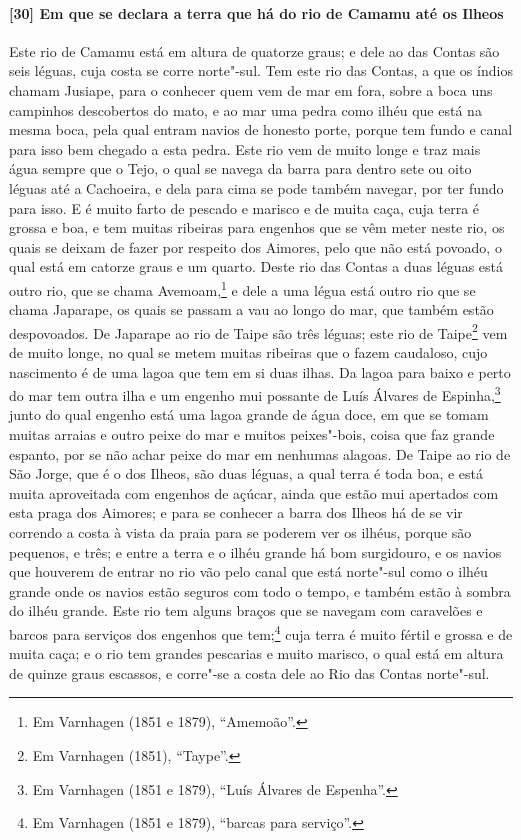 \paragraph{[30] Em que se declara a terra que há do rio de Camamu até os Ilheos} \quad
Este rio de Camamu está em altura de quatorze graus; e dele ao das Contas são seis léguas,
cuja costa se corre norte"-sul. Tem este rio das Contas, a que os índios chamam Jusiape,
para o conhecer quem vem de mar em fora, sobre a boca uns campinhos descobertos do mato, e
ao mar uma pedra como ilhéu que está na mesma boca, pela qual entram navios de honesto
porte, porque tem fundo e canal para isso bem chegado a esta pedra. Este rio vem de muito
longe e traz mais água sempre que o Tejo, o qual se navega da barra para dentro sete ou
oito léguas até a Cachoeira, e dela para cima se pode também navegar, por ter fundo para
isso. E é muito farto de pescado e marisco e de muita caça, cuja terra é grossa e boa, e
tem muitas ribeiras para engenhos que se vêm meter neste rio, os quais se deixam de fazer
por respeito dos Aimores, pelo que não está povoado, o qual está em catorze graus e um
quarto. Deste rio das Contas a duas léguas está outro rio, que se chama Avemoam,\footnote{
Em Varnhagen (1851 e 1879), ``Amemoão''.} e dele a uma légua está outro rio que se chama
Japarape, os quais se passam a vau ao longo do mar, que também estão despovoados. De
Japarape ao rio de Taipe são três léguas; este rio de Taipe\footnote{ Em Varnhagen (1851),
``Taype''.} vem de muito longe, no qual se metem muitas ribeiras que o fazem caudaloso,
cujo nascimento é de uma lagoa que tem em si duas ilhas. Da lagoa para baixo e perto do
mar tem outra ilha e um engenho mui possante de Luís Álvares de Espinha,\footnote{ Em
Varnhagen (1851 e 1879), ``Luís Álvares de Espenha''.} junto do qual engenho está uma
lagoa grande de água doce, em que se tomam muitas arraias e outro peixe do mar e muitos
peixes"-bois, coisa que faz grande espanto, por se não achar peixe do mar em nenhumas
alagoas. De Taipe ao rio de São Jorge, que é o dos Ilheos, são duas léguas, a qual terra é
toda boa, e está muita aproveitada com engenhos de açúcar, ainda que estão mui apertados
com esta praga dos Aimores; e para se conhecer a barra dos Ilheos há de se vir correndo a
costa à vista da praia para se poderem ver os ilhéus, porque são pequenos, e três; e entre
a terra e o ilhéu grande há bom surgidouro, e os navios que houverem de entrar no rio vão
pelo canal que está norte"-sul como o ilhéu grande onde os navios estão seguros com todo o
tempo, e também estão à sombra do ilhéu grande. Este rio tem alguns braços que se navegam
com caravelões e barcos para serviços dos engenhos que tem;\footnote{ Em Varnhagen (1851 e
1879), ``barcas para serviço''.} cuja terra é muito fértil e grossa e de muita caça; e o
rio tem grandes pescarias e muito marisco, o qual está em altura de quinze graus escassos,
e corre"-se a costa dele ao Rio das Contas norte"-sul.

